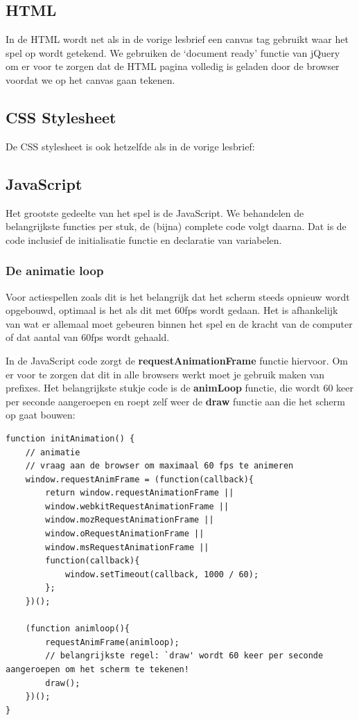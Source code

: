 \documentclass[a4paper]{report}
\begin{document}
\subsection*{HTML}
In de HTML wordt net als in de vorige lesbrief een canvas tag gebruikt waar het spel op wordt getekend. We gebruiken de `document ready' functie van jQuery om er voor te zorgen dat de HTML pagina volledig is geladen door de browser voordat we op het canvas gaan tekenen.



\subsection*{CSS Stylesheet}
\noindent De CSS stylesheet is ook hetzelfde als in de vorige lesbrief:



\subsection*{JavaScript}
\noindent Het grootste gedeelte van het spel is de JavaScript. We behandelen de belangrijkste functies per stuk, de (bijna) complete code volgt daarna. Dat is de code inclusief de initialisatie functie en declaratie van variabelen.

\subsubsection*{De animatie loop}
Voor actiespellen zoals dit is het belangrijk dat het scherm steeds opnieuw wordt opgebouwd, optimaal is het als dit met 60fps wordt gedaan. Het is afhankelijk van wat er allemaal moet gebeuren binnen het spel en de kracht van de computer of dat aantal van 60fps wordt gehaald. 

In de JavaScript code zorgt de \textbf{requestAnimationFrame} functie hiervoor. Om er voor te zorgen dat dit in alle browsers werkt moet je gebruik maken van prefixes. Het belangrijkste stukje code is de \textbf{animLoop} functie, die wordt 60 keer per seconde aangeroepen en roept zelf weer de \textbf{draw} functie aan die het scherm op gaat bouwen:

\begin{lstlisting}[numbers=none]
function initAnimation() {
	// animatie
	// vraag aan de browser om maximaal 60 fps te animeren
	window.requestAnimFrame = (function(callback){
		return window.requestAnimationFrame ||
		window.webkitRequestAnimationFrame ||
		window.mozRequestAnimationFrame ||
		window.oRequestAnimationFrame ||
		window.msRequestAnimationFrame ||
		function(callback){
			window.setTimeout(callback, 1000 / 60);
		};
	})();
	
	(function animloop(){
		requestAnimFrame(animloop);	
		// belangrijkste regel: `draw' wordt 60 keer per seconde aangeroepen om het scherm te tekenen!
		draw();
	})();
}
\end{lstlisting}
\end{document}
